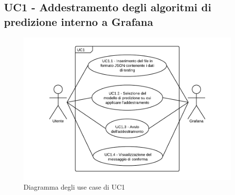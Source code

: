 \subsection{UC1 - Addestramento degli algoritmi di predizione interno a Grafana}
\begin{figure}[H]
\includegraphics{img/UC1 - Addestramento degli algoritmi di predizione interno a Grafana.png}
\caption{Diagramma degli use case di UC1}
\end{figure}
